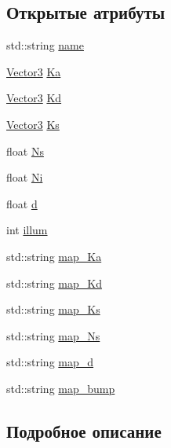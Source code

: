 \subsection*{Открытые атрибуты}
\begin{DoxyCompactItemize}
\item 
std\+::string \hyperlink{structobjl_1_1_material_ae018ffdcbb8dfa9ed36605b048bbfac1}{name}
\item 
\hyperlink{structobjl_1_1_vector3}{Vector3} \hyperlink{structobjl_1_1_material_a13c3660fd7fc3924f7811c46ca3f1272}{Ka}
\item 
\hyperlink{structobjl_1_1_vector3}{Vector3} \hyperlink{structobjl_1_1_material_a16b7219d2d20e5f7a58e14f68b663a98}{Kd}
\item 
\hyperlink{structobjl_1_1_vector3}{Vector3} \hyperlink{structobjl_1_1_material_ac1298eff05de5020120a143f21058b83}{Ks}
\item 
float \hyperlink{structobjl_1_1_material_ad02f64d02fa971cebc3195d90a73748c}{Ns}
\item 
float \hyperlink{structobjl_1_1_material_a9b42dd253954cf9547593831fbbed8bc}{Ni}
\item 
float \hyperlink{structobjl_1_1_material_a40db214eba05836b431e544dd7b920f4}{d}
\item 
int \hyperlink{structobjl_1_1_material_aa2139e47cf27614acce8c10cc829497a}{illum}
\item 
std\+::string \hyperlink{structobjl_1_1_material_a993d3394b3aa0116ac2031f870eda49b}{map\+\_\+\+Ka}
\item 
std\+::string \hyperlink{structobjl_1_1_material_a84fe6a74e5a48a18a875431519a5c2e9}{map\+\_\+\+Kd}
\item 
std\+::string \hyperlink{structobjl_1_1_material_a6ec9644f4152d4e60c471cb2df021345}{map\+\_\+\+Ks}
\item 
std\+::string \hyperlink{structobjl_1_1_material_a02919bada38d25c16ea2e2c4b2f514ec}{map\+\_\+\+Ns}
\item 
std\+::string \hyperlink{structobjl_1_1_material_a1e3769e9fc62f4ba49e4888428931c9f}{map\+\_\+d}
\item 
std\+::string \hyperlink{structobjl_1_1_material_af4e42567a2077c6e165f95403fc06c20}{map\+\_\+bump}
\end{DoxyCompactItemize}


\subsection{Подробное описание}


